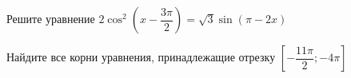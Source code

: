 \begin{ex}
	\begin{condition}
		\begin{enumcols}[label=\asbuk*)]
			\item Решите уравнение \( 2\cos^2 {\left(x - \dfrac{3\pi}{2}\right)}= \sqrt{3}\sin{(\pi - 2x)} \)
			\item Найдите все корни уравнения, принадлежащие отрезку \( \left[-\dfrac{11\pi}{2};-4\pi\right] \)
		\end{enumcols}
	\end{condition}
\end{ex}